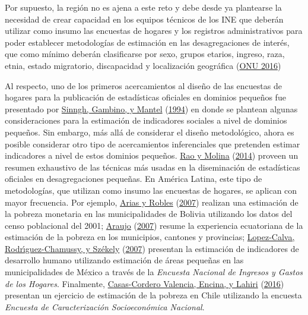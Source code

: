 \documentclass[
  12pt,
  spanish,
]{book}
\begin{document}
Por supuesto, la región no es ajena a este reto y debe desde ya plantearse la necesidad de crear capacidad en los equipos técnicos de los INE que deberán utilizar como insumo las encuestas de hogares y los registros administrativos para poder establecer metodologías de estimación en las desagregaciones de interés, que como mínimo deberán clasificarse por sexo, grupos etarios, ingreso, raza, etnia, estado migratorio, discapacidad y localización geográfica (\protect\hyperlink{ref-United_Nations_2016}{ONU 2016})

Al respecto, uno de los primeros acercamientos al diseño de las encuestas de hogares para la publicación de estadísticas oficiales en dominios pequeños fue presentado por \protect\hyperlink{ref-Sinngh_Gambino_Mantel_1994}{Sinngh, Gambino, y Mantel} (\protect\hyperlink{ref-Sinngh_Gambino_Mantel_1994}{1994}) en donde se plantean algunas consideraciones para la estimación de indicadores sociales a nivel de dominios pequeños. Sin embargo, más allá de considerar el diseño metodológico, ahora es posible considerar otro tipo de acercamientos inferenciales que pretenden estimar indicadores a nivel de estos dominios pequeños. \protect\hyperlink{ref-Rao_Molina_2014}{Rao y Molina} (\protect\hyperlink{ref-Rao_Molina_2014}{2014}) proveen un resumen exhaustivo de las técnicas más usadas en la diseminación de estadísticas oficiales en desagregaciones pequeñas. En América Latina, este tipo de metodologías, que utilizan como insumo las encuestas de hogares, se aplican con mayor frecuencia. Por ejemplo, \protect\hyperlink{ref-arias2007geography}{Arias y Robles} (\protect\hyperlink{ref-arias2007geography}{2007}) realizan una estimación de la pobreza monetaria en las municipalidades de Bolivia utilizando los datos del censo poblacional del 2001; \protect\hyperlink{ref-araujo20071990}{Araujo} (\protect\hyperlink{ref-araujo20071990}{2007}) resume la experiencia ecuatoriana de la estimación de la pobreza en los municipios, cantones y provincias; \protect\hyperlink{ref-lopez2007poverty}{Lopez-Calva, Rodrı́guez-Chamussy, y Székely} (\protect\hyperlink{ref-lopez2007poverty}{2007}) presentan la estimación de indicadores de desarrollo humano utilizando estimación de áreas pequeñas en las municipalidades de México a través de la \emph{Encuesta Nacional de Ingresos y Gastos de los Hogares}. Finalmente, \protect\hyperlink{ref-Casas_Cordero_Valencia_Encina_Lahiri_2016}{Casas-Cordero Valencia, Encina, y Lahiri} (\protect\hyperlink{ref-Casas_Cordero_Valencia_Encina_Lahiri_2016}{2016}) presentan un ejercicio de estimación de la pobreza en Chile utilizando la encuesta \emph{Encuesta de Caracterización Socioeconómica Nacional}.
\end{document}
